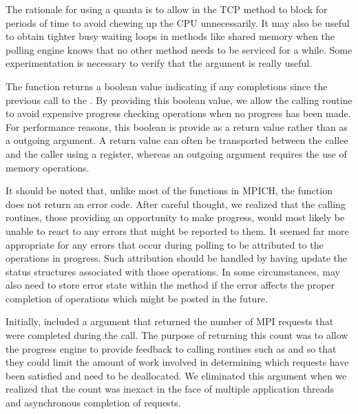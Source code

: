 \begin{discussion}
  The rationale for using a quanta is to allow  in the TCP
  method to block for periods of time to avoid chewing up the CPU
  unnecessarily.  It may also be useful to obtain tighter busy waiting loops in
  methods like shared memory when the polling engine knows that no other method
  needs to be serviced for a while.  Some experimentation is necessary to
  verify that the  argument is really useful.
\end{discussion}

The  function returns a boolean value indicating if any
completions since the previous call to the .  By providing
this boolean value, we allow the calling routine to avoid expensive progress
checking operations when no progress has been made.  For performance reasons,
this boolean is provide as a return value rather than as a outgoing argument.
A return value can often be transported between the callee and the caller using
a register, whereas an outgoing argument requires the use of memory operations.

It should be noted that, unlike most of the functions in MPICH, the
 function does not return an error code.  After careful
thought, we realized that the calling routines, those providing an opportunity
to make progress, would most likely be unable to react to any errors that might
be reported to them.  It seemed far more appropriate for any errors that occur
during polling to be attributed to the operations in progress.  Such
attribution should be handled by having  update the status
structures associated with those operations.  In some circumstances,
 may also need to store error state within the method if the
error affects the proper completion of operations which might be posted in the
future.

\begin{discussion}
Initially,  included a  argument that returned the
number of MPI requests that were completed during the call.  The purpose of
returning this count was to allow the progress engine to provide feedback to
calling routines such as  and  so that they could
limit the amount of work involved in determining which requests have been
satisfied and need to be deallocated.  We eliminated this argument when we
realized that the count was inexact in the face of multiple application threads
and asynchronous completion of requests.
\end{discussion}

